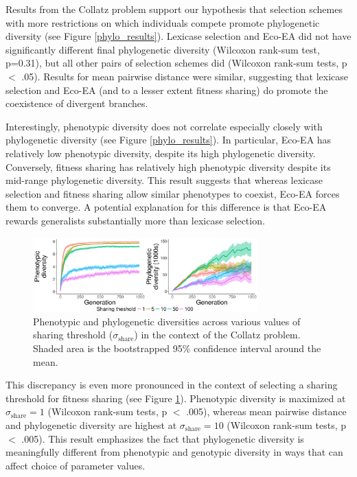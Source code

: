 Results from the Collatz problem support our hypothesis that selection schemes with more restrictions on which individuals compete %
promote phylogenetic diversity (see Figure \ref{phylo_results}). Lexicase selection and Eco-EA did not have significantly different final phylogenetic diversity (Wilcoxon rank-sum test, p=0.31), but all other pairs of selection schemes did (Wilcoxon rank-sum tests, p $<$ .05). Results for mean pairwise distance were similar, suggesting that lexicase selection and Eco-EA (and to a lesser extent fitness sharing) do promote the coexistence of divergent branches. 

Interestingly, phenotypic diversity does not correlate especially closely with phylogenetic diversity (see Figure \ref{phylo_results}). In particular, Eco-EA has relatively low phenotypic diversity, despite its high phylogenetic diversity. Conversely, fitness sharing has relatively high phenotypic diversity despite its mid-range phylogenetic diversity. This result suggests that whereas lexicase selection and fitness sharing allow similar phenotypes to coexist, Eco-EA forces them to converge. A potential explanation for this difference is that Eco-EA rewards generalists substantially more than lexicase selection.

\begin{figure}
\includegraphics[width=3.4in]{figs/time_sharing.png}
\caption{Phenotypic and phylogenetic diversities across various values of sharing threshold ($\sigma_{\text{share}}$) in the context of the Collatz problem. Shaded area is the bootstrapped 95\% confidence interval around the mean.}
\label{sharing}
\end{figure}

This discrepancy is even more pronounced in the context of selecting a sharing threshold for fitness sharing (see Figure \ref{sharing}). Phenotypic diversity is maximized at  $\sigma_{\text{share}} = 1$  (Wilcoxon rank-sum tests, p $<$ .005), whereas mean pairwise distance and phylogenetic diversity are highest at $\sigma_{\text{share}} = 10$  (Wilcoxon rank-sum tests, p $<$ .005). This result emphasizes the fact that phylogenetic diversity is meaningfully different from phenotypic and genotypic diversity in ways that can affect choice of parameter values.

